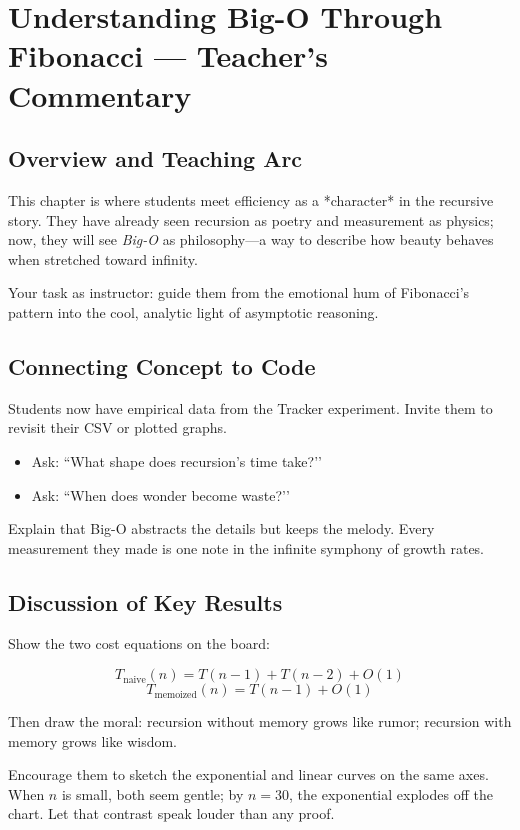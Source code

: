 \chapter{Understanding Big-O Through Fibonacci --- Teacher's Commentary}
\label{ch05_big_o_through_fib_solution}

\section{Overview and Teaching Arc}
This chapter is where students meet efficiency as a *character* in the recursive story.
They have already seen recursion as poetry and measurement as physics;
now, they will see \emph{Big-O} as philosophy---a way to describe how beauty
behaves when stretched toward infinity.

Your task as instructor: guide them from the emotional hum of Fibonacci’s
pattern into the cool, analytic light of asymptotic reasoning.

\section{Connecting Concept to Code}
Students now have empirical data from the Tracker experiment.
Invite them to revisit their CSV or plotted graphs.

\begin{itemize}
  \item Ask: ``What shape does recursion’s time take?’’
  \item Ask: ``When does wonder become waste?’’
\end{itemize}

Explain that Big-O abstracts the details but keeps the melody.
Every measurement they made is one note in the infinite symphony of growth rates.

\section{Discussion of Key Results}
Show the two cost equations on the board:

\[
T_{\text{naive}}(n) = T(n-1) + T(n-2) + O(1)
\]
\[
T_{\text{memoized}}(n) = T(n-1) + O(1)
\]

Then draw the moral:
recursion without memory grows like rumor; recursion with memory grows like wisdom.

Encourage them to sketch the exponential and linear curves on the same axes.
When $n$ is small, both seem gentle; by $n=30$, the exponential explodes off the chart.
Let that contrast speak louder than any proof.

